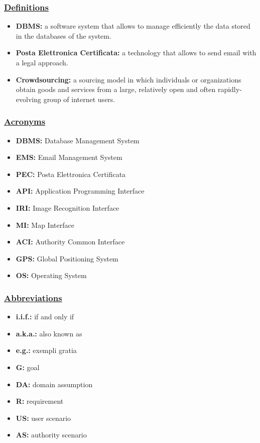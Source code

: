 	\subsubsection[Definitions]{\hyperlink{toc}{Definitions}}
		\begin{itemize}
			\item \textbf{DBMS:} a software system that allows to manage efficiently the data stored in the databases of the system.
			\item \textbf{Posta Elettronica Certificata:} a technology that allows to send email with a legal approach.
			\item \textbf{Crowdsourcing:} a sourcing model in which individuals or organizations obtain goods and services from a large, relatively open and often rapidly-evolving group of internet users.
		\end{itemize}
	
	\subsubsection[Acronyms]{\hyperlink{toc}{Acronyms}}
		\begin{itemize}
			\item \textbf{DBMS:} Database Management System
			\item \textbf{EMS:} Email Management System
			\item \textbf{PEC:} Posta Elettronica Certificata
			\item \textbf{API:} Application Programming Interface
			\item \textbf{IRI:} Image Recognition Interface
			\item \textbf{MI:} Map Interface
			\item \textbf{ACI:} Authority Common Interface
			\item \textbf{GPS:} Global Positioning System
			\item \textbf{OS:} Operating System
		\end{itemize}
	
	\subsubsection[Abbreviations]{\hyperlink{toc}{Abbreviations}}
		\begin{itemize}
	        \item \textbf{i.i.f.:} if and only if
	        \item \textbf{a.k.a.:} also known as
	        \item \textbf{e.g.:} exempli gratia
			\item \textbf{G:} goal
			\item \textbf{DA:} domain assumption
			\item \textbf{R:} requirement
			\item \textbf{US:} user scenario
			\item \textbf{AS:} authority scenario
		\end{itemize}
		
